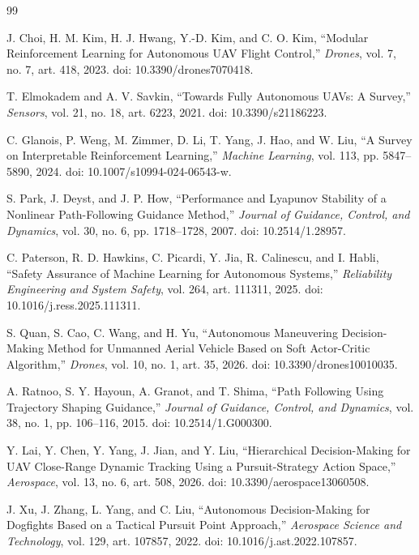 \documentclass[drones,article,submit,pdftex,moreauthors]{Definitions/mdpi}
\begin{document}
\begin{thebibliography}{99}

J. Choi, H. M. Kim, H. J. Hwang, Y.-D. Kim, and C. O. Kim,
``Modular Reinforcement Learning for Autonomous UAV Flight Control,''
\emph{Drones}, vol. 7, no. 7, art. 418, 2023.
doi: 10.3390/drones7070418.

T. Elmokadem and A. V. Savkin,
``Towards Fully Autonomous UAVs: A Survey,''
\emph{Sensors}, vol. 21, no. 18, art. 6223, 2021.
doi: 10.3390/s21186223.

C. Glanois, P. Weng, M. Zimmer, D. Li, T. Yang, J. Hao, and W. Liu,
``A Survey on Interpretable Reinforcement Learning,''
\emph{Machine Learning}, vol. 113, pp. 5847--5890, 2024.
doi: 10.1007/s10994-024-06543-w.

S. Park, J. Deyst, and J. P. How,
``Performance and Lyapunov Stability of a Nonlinear Path-Following Guidance Method,''
\emph{Journal of Guidance, Control, and Dynamics}, vol. 30, no. 6, pp. 1718--1728, 2007.
doi: 10.2514/1.28957.

C. Paterson, R. D. Hawkins, C. Picardi, Y. Jia, R. Calinescu, and I. Habli,
``Safety Assurance of Machine Learning for Autonomous Systems,''
\emph{Reliability Engineering and System Safety}, vol. 264, art. 111311, 2025.
doi: 10.1016/j.ress.2025.111311.

S. Quan, S. Cao, C. Wang, and H. Yu,
``Autonomous Maneuvering Decision-Making Method for Unmanned Aerial Vehicle Based on Soft Actor-Critic Algorithm,''
\emph{Drones}, vol. 10, no. 1, art. 35, 2026.
doi: 10.3390/drones10010035.

A. Ratnoo, S. Y. Hayoun, A. Granot, and T. Shima,
``Path Following Using Trajectory Shaping Guidance,''
\emph{Journal of Guidance, Control, and Dynamics}, vol. 38, no. 1, pp. 106--116, 2015.
doi: 10.2514/1.G000300.

Y. Lai, Y. Chen, Y. Yang, J. Jian, and Y. Liu,
``Hierarchical Decision-Making for UAV Close-Range Dynamic Tracking Using a Pursuit-Strategy Action Space,''
\emph{Aerospace}, vol. 13, no. 6, art. 508, 2026.
doi: 10.3390/aerospace13060508.

J. Xu, J. Zhang, L. Yang, and C. Liu,
``Autonomous Decision-Making for Dogfights Based on a Tactical Pursuit Point Approach,''
\emph{Aerospace Science and Technology}, vol. 129, art. 107857, 2022.
doi: 10.1016/j.ast.2022.107857.


\end{thebibliography}
\end{document}
